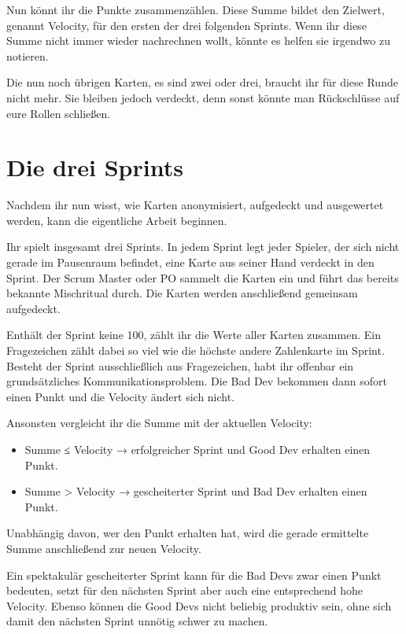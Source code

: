 \documentclass[10pt,a4paper]{article}
\begin{document}
Nun könnt ihr die Punkte zusammenzählen. Diese Summe bildet den Zielwert, genannt Velocity, für den ersten der drei folgenden Sprints. Wenn ihr diese Summe nicht immer wieder nachrechnen wollt, könnte es helfen sie irgendwo zu notieren.

Die nun noch übrigen Karten, es sind zwei oder drei, braucht ihr für diese Runde nicht mehr. Sie bleiben jedoch verdeckt, denn sonst könnte man Rückschlüsse auf eure Rollen schließen.

\clearpage
\section{Die drei Sprints}

Nachdem ihr nun wisst, wie Karten anonymisiert, aufgedeckt und ausgewertet werden, kann die eigentliche Arbeit beginnen.

Ihr spielt insgesamt drei Sprints. In jedem Sprint legt jeder Spieler, der sich nicht gerade im Pausenraum befindet, eine Karte aus seiner Hand verdeckt in den Sprint. Der Scrum Master oder PO sammelt die Karten ein und führt das bereits bekannte Mischritual durch. Die Karten werden anschließend gemeinsam aufgedeckt.

Enthält der Sprint keine 100, zählt ihr die Werte aller Karten zusammen. Ein Fragezeichen zählt dabei so viel wie die höchste andere Zahlenkarte im Sprint. Besteht der Sprint ausschließlich aus Fragezeichen, habt ihr offenbar ein grundsätzliches Kommunikationsproblem. Die Bad Dev bekommen dann sofort einen Punkt und die Velocity ändert sich nicht.

Ansonsten vergleicht ihr die Summe mit der aktuellen Velocity:

\begin{itemize}
  \item Summe ≤ Velocity → erfolgreicher Sprint und Good Dev erhalten einen Punkt.
  \item Summe > Velocity → gescheiterter Sprint und Bad Dev erhalten einen Punkt.
\end{itemize}

Unabhängig davon, wer den Punkt erhalten hat, wird die gerade ermittelte Summe anschließend zur neuen Velocity.

Ein spektakulär gescheiterter Sprint kann für die Bad Devs zwar einen Punkt bedeuten, setzt für den nächsten Sprint aber auch eine entsprechend hohe Velocity. Ebenso können die Good Devs nicht beliebig produktiv sein, ohne sich damit den nächsten Sprint unnötig schwer zu machen.
\end{document}
